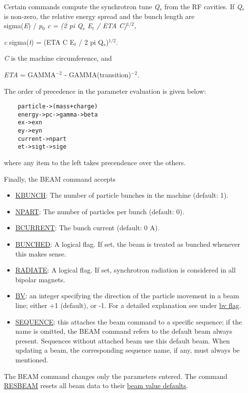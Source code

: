 Certain commands compute the synchrotron tune \textit{Q$_s$} from the RF
cavities. If \textit{Q$_s$} is non-zero, the relative energy spread and
the bunch length are  \\
sigma(\textit{E}) / \textit{p$_0$ c =  (2 pi Q$_s$ E$_t$ / ETA C)$^{1/2}$}, 

\textit{c} sigma(\textit{t}) = (ETA C E$_t$ / 2 pi Q$_s$)$^{1/2}$. 

\textit{C} is the machine circumference, and 

\textit{ETA} = GAMMA$^{-2}$ - GAMMA(transition)$^{-2}$. 

The order of precedence in the parameter evaluation is given below: 
\begin{verbatim}
    particle->(mass+charge)
    energy->pc->gamma->beta
    ex->exn
    ey->eyn
    current->npart
    et->sigt->sige
\end{verbatim} 

where any item to the left takes precendence over the others. 

Finally, the BEAM command accepts 
\begin{itemize}
   \item \href{kbunch}{KBUNCH}: The number of particle bunches in the
     machine (default: 1).  
   \item \href{npart}{NPART}: The number of particles per bunch (default: 0). 
   \item \href{bcurrent}{BCURRENT}: The bunch current (default: 0 A). 
   \item \href{bunched}{BUNCHED}: A logical flag. If set, the beam is
     treated as bunched whenever this makes sense.  
   \item \href{radiate}{RADIATE}: A logical flag. If set, synchrotron
     radiation is considered in all bipolar magnets.  
   \item \href{bv}{BV}: an integer specifying the direction of the
     particle movement in a beam line; either +1 (default), or -1. For a
     detailed explanation see under \href{bv_flag.html}{bv flag}.  
   \item \href{sequence}{SEQUENCE}: this attaches the beam command to a
     specific sequence; if the name is omitted, the BEAM command refers
     to the default beam always present. Sequences without attached beam
     use this default beam. When updating a beam, the corresponding
     sequence name, if any, must always be mentioned.  
\end{itemize} 

The BEAM command changes only the parameters entered. The command
\href{resbeam.html}{RESBEAM} resets all beam data to their
\href{resbeam.html#defaults}{beam value defaults}.  

